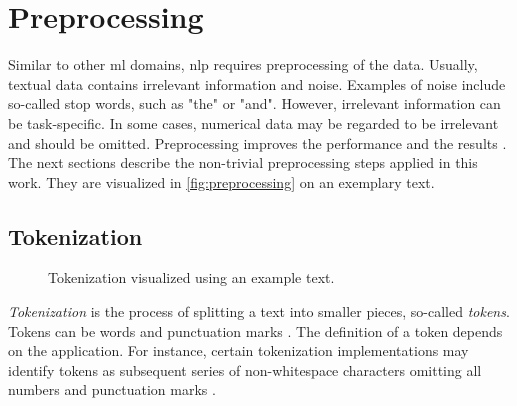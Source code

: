 \section{Preprocessing}\label{sec:preprocessing}

Similar to other \ac{ml} domains, \ac{nlp} requires preprocessing of the data.
Usually, textual data contains irrelevant information and noise.
Examples of noise include so-called stop words, such as "the" or "and".
However, irrelevant information can be task-specific. 
In some cases, numerical data may be regarded to be irrelevant and should be omitted.
Preprocessing improves the performance and the results \cite{clusteringDocs2020}.
The next sections describe the non-trivial preprocessing steps applied in this work.
They are visualized in \autoref{fig:preprocessing} on an exemplary text.



\subsection{Tokenization}\label{subsec:tokenization}

\begin{figure}[!htb] %
    \centering
    
    \caption[Tokenization]{Tokenization visualized using an example text.}
    \label{fig:preproc-tokenization}
\end{figure}

\textit{Tokenization} is the process of splitting a text into smaller pieces, so-called \textit{tokens}.
Tokens can be words and punctuation marks \cite{nlp-book2009}.
The definition of a token depends on the application.
For instance, certain tokenization implementations may identify tokens as subsequent series of non-whitespace characters omitting all numbers and punctuation marks \cite{IR2011}.




\subsection{\stopWordRemoval{}}\label{subsec:stop-word-removal}

